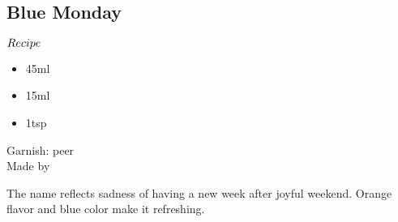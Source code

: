 \subsection{Blue Monday}
\begin{itembox}[l]{\boldmath $Recipe$}
\begin{itemize}
\setlength{\parskip}{0cm}
\setlength{\itemsep}{0cm}
\item \vodka 45ml
\item \wc 15ml
\item \bc 1tsp
\end{itemize}
\vspace{-4mm}
Garnish: \orange peer\\
Made by \shake
\end{itembox}
The name reflects sadness of having a new week after joyful weekend.
Orange flavor and blue color make it refreshing.
